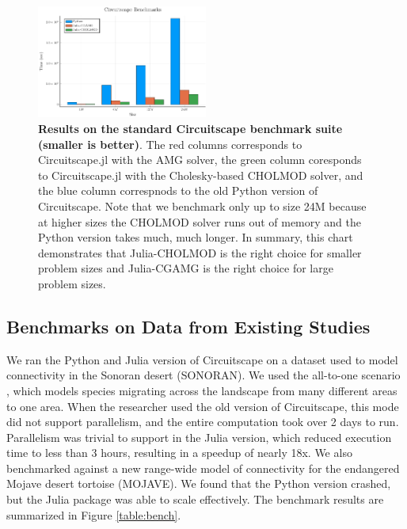 \documentclass{juliacon}
\begin{document}
\begin{figure}
    \centering
    \includegraphics[width=0.5\textwidth]{bench.pdf}
    \caption{\textbf{Results on the standard Circuitscape benchmark suite (smaller is better)}. The red columns corresponds to Circuitscape.jl with the AMG solver, the green column coresponds to Circuitscape.jl with the Cholesky-based CHOLMOD solver, and the blue column correspnods to the old Python version of Circuitscape. Note that we benchmark only up to size 24M because at higher sizes the CHOLMOD solver runs out of memory and the Python version takes much, much longer. In summary, this chart demonstrates that Julia-CHOLMOD is the right choice for smaller problem sizes and Julia-CGAMG is the right choice for large problem sizes.}
    \label{fig:csbench}
\end{figure}

\subsection{Benchmarks on Data from Existing Studies}

We ran the Python and Julia version of Circuitscape on a dataset used to model connectivity in the Sonoran desert \cite{drake2017using} (SONORAN). We used the all-to-one scenario \cite{mcrae2009circuitscape}, which models species migrating across the landscape from many different areas to one area. When the researcher used the old version of Circuitscape, this mode did not support parallelism, and the entire computation took over 2 days to run. Parallelism was trivial to support in the Julia version, which reduced execution time to less than 3 hours, resulting in a speedup of nearly 18x. We also benchmarked against a new range-wide model of connectivity for the endangered Mojave desert tortoise \cite{gray2019}(MOJAVE). We found that the Python version crashed, but the Julia package was able to scale effectively. The benchmark results are summarized in Figure \ref{table:bench}. 
\end{document}
